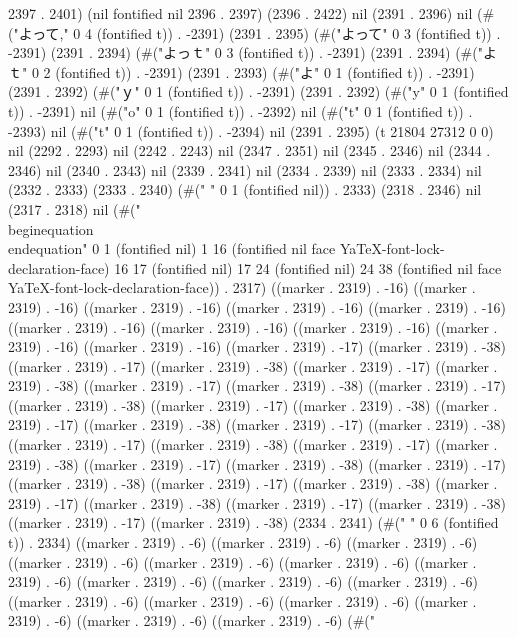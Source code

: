 2397 . 2401) (nil fontified nil 2396 . 2397) (2396 . 2422) nil (2391 . 2396) nil (#("よって," 0 4 (fontified t)) . -2391) (2391 . 2395) (#("よって" 0 3 (fontified t)) . -2391) (2391 . 2394) (#("よっｔ" 0 3 (fontified t)) . -2391) (2391 . 2394) (#("よｔ" 0 2 (fontified t)) . -2391) (2391 . 2393) (#("よ" 0 1 (fontified t)) . -2391) (2391 . 2392) (#("ｙ" 0 1 (fontified t)) . -2391) (2391 . 2392) (#("y" 0 1 (fontified t)) . -2391) nil (#("o" 0 1 (fontified t)) . -2392) nil (#("t" 0 1 (fontified t)) . -2393) nil (#("t" 0 1 (fontified t)) . -2394) nil (2391 . 2395) (t 21804 27312 0 0) nil (2292 . 2293) nil (2242 . 2243) nil (2347 . 2351) nil (2345 . 2346) nil (2344 . 2346) nil (2340 . 2343) nil (2339 . 2341) nil (2334 . 2339) nil (2333 . 2334) nil (2332 . 2333) (2333 . 2340) (#("	" 0 1 (fontified nil)) . 2333) (2318 . 2346) nil (2317 . 2318) nil (#("\\begin{equation}
       \\end{equation}" 0 1 (fontified nil) 1 16 (fontified nil face YaTeX-font-lock-declaration-face) 16 17 (fontified nil) 17 24 (fontified nil) 24 38 (fontified nil face YaTeX-font-lock-declaration-face)) . 2317) ((marker . 2319) . -16) ((marker . 2319) . -16) ((marker . 2319) . -16) ((marker . 2319) . -16) ((marker . 2319) . -16) ((marker . 2319) . -16) ((marker . 2319) . -16) ((marker . 2319) . -16) ((marker . 2319) . -16) ((marker . 2319) . -16) ((marker . 2319) . -17) ((marker . 2319) . -38) ((marker . 2319) . -17) ((marker . 2319) . -38) ((marker . 2319) . -17) ((marker . 2319) . -38) ((marker . 2319) . -17) ((marker . 2319) . -38) ((marker . 2319) . -17) ((marker . 2319) . -38) ((marker . 2319) . -17) ((marker . 2319) . -38) ((marker . 2319) . -17) ((marker . 2319) . -38) ((marker . 2319) . -17) ((marker . 2319) . -38) ((marker . 2319) . -17) ((marker . 2319) . -38) ((marker . 2319) . -17) ((marker . 2319) . -38) ((marker . 2319) . -17) ((marker . 2319) . -38) ((marker . 2319) . -17) ((marker . 2319) . -38) ((marker . 2319) . -17) ((marker . 2319) . -38) ((marker . 2319) . -17) ((marker . 2319) . -38) ((marker . 2319) . -17) ((marker . 2319) . -38) ((marker . 2319) . -17) ((marker . 2319) . -38) (2334 . 2341) (#("      " 0 6 (fontified t)) . 2334) ((marker . 2319) . -6) ((marker . 2319) . -6) ((marker . 2319) . -6) ((marker . 2319) . -6) ((marker . 2319) . -6) ((marker . 2319) . -6) ((marker . 2319) . -6) ((marker . 2319) . -6) ((marker . 2319) . -6) ((marker . 2319) . -6) ((marker . 2319) . -6) ((marker . 2319) . -6) ((marker . 2319) . -6) ((marker . 2319) . -6) ((marker . 2319) . -6) ((marker . 2319) . -6) (#("
